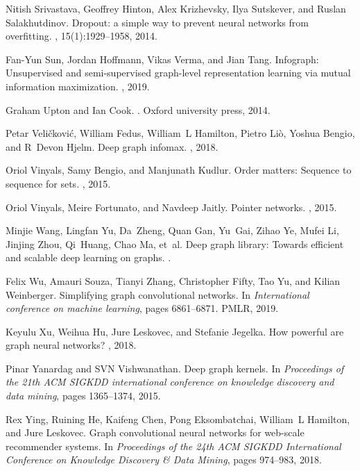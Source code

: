 \documentclass{article}
\begin{document}
\begin{thebibliography}{999}
	Nitish Srivastava, Geoffrey Hinton, Alex Krizhevsky, Ilya Sutskever, and Ruslan
	Salakhutdinov.
	\newblock Dropout: a simple way to prevent neural networks from overfitting.
	, 15(1):1929--1958,
	2014.
	
	Fan-Yun Sun, Jordan Hoffmann, Vikas Verma, and Jian Tang.
	\newblock Infograph: Unsupervised and semi-supervised graph-level
	representation learning via mutual information maximization.
	, 2019.
	
	Graham Upton and Ian Cook.
	.
	\newblock Oxford university press, 2014.
	
	Petar Veli{\v{c}}kovi{\'c}, William Fedus, William~L Hamilton, Pietro Li{\`o},
	Yoshua Bengio, and R~Devon Hjelm.
	\newblock Deep graph infomax.
	, 2018.
	
	Oriol Vinyals, Samy Bengio, and Manjunath Kudlur.
	\newblock Order matters: Sequence to sequence for sets.
	, 2015.
	
	Oriol Vinyals, Meire Fortunato, and Navdeep Jaitly.
	\newblock Pointer networks.
	, 2015.
	
	Minjie Wang, Lingfan Yu, Da~Zheng, Quan Gan, Yu~Gai, Zihao Ye, Mufei Li,
	Jinjing Zhou, Qi~Huang, Chao Ma, et~al.
	\newblock Deep graph library: Towards efficient and scalable deep learning on
	graphs.
	.
	
	Felix Wu, Amauri Souza, Tianyi Zhang, Christopher Fifty, Tao Yu, and Kilian
	Weinberger.
	\newblock Simplifying graph convolutional networks.
	\newblock In {\em International conference on machine learning}, pages
	6861--6871. PMLR, 2019.
	
	Keyulu Xu, Weihua Hu, Jure Leskovec, and Stefanie Jegelka.
	\newblock How powerful are graph neural networks?
	, 2018.
	
	Pinar Yanardag and SVN Vishwanathan.
	\newblock Deep graph kernels.
	\newblock In {\em Proceedings of the 21th ACM SIGKDD international conference
		on knowledge discovery and data mining}, pages 1365--1374, 2015.
	
	Rex Ying, Ruining He, Kaifeng Chen, Pong Eksombatchai, William~L Hamilton, and
	Jure Leskovec.
	\newblock Graph convolutional neural networks for web-scale recommender
	systems.
	\newblock In {\em Proceedings of the 24th ACM SIGKDD International Conference
		on Knowledge Discovery \& Data Mining}, pages 974--983, 2018.
	

\end{thebibliography}
\end{document}
